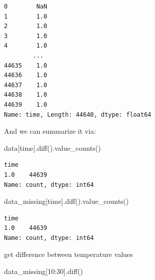 \documentclass[
  letterpaper,
  DIV=11,
  numbers=noendperiod]{scrreprt}
\newenvironment{Shaded}{\begin{snugshade}}{\end{snugshade}}
\newcommand{\DecValTok}[1]{\textcolor[rgb]{0.68,0.00,0.00}{#1}}
\newcommand{\NormalTok}[1]{\textcolor[rgb]{0.00,0.23,0.31}{#1}}
\newcommand{\StringTok}[1]{\textcolor[rgb]{0.13,0.47,0.30}{#1}}
\begin{document}
\begin{verbatim}
0        NaN
1        1.0
2        1.0
3        1.0
4        1.0
        ... 
44635    1.0
44636    1.0
44637    1.0
44638    1.0
44639    1.0
Name: time, Length: 44640, dtype: float64
\end{verbatim}

And we can summarize it via:

\begin{Shaded}
\begin{Highlighting}[]
\NormalTok{data[}\StringTok{\textquotesingle{}time\textquotesingle{}}\NormalTok{].diff().value\_counts()}
\end{Highlighting}
\end{Shaded}

\begin{verbatim}
time
1.0    44639
Name: count, dtype: int64
\end{verbatim}

\begin{Shaded}
\begin{Highlighting}[]
\NormalTok{data\_missing[}\StringTok{\textquotesingle{}time\textquotesingle{}}\NormalTok{].diff().value\_counts()}
\end{Highlighting}
\end{Shaded}

\begin{verbatim}
time
1.0    44639
Name: count, dtype: int64
\end{verbatim}

get difference between temperature values

\begin{Shaded}
\begin{Highlighting}[]
\NormalTok{data\_missing[}\DecValTok{10}\NormalTok{:}\DecValTok{30}\NormalTok{].diff()}
\end{Highlighting}
\end{Shaded}
\end{document}
